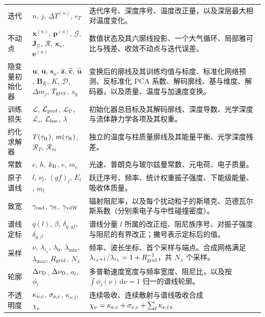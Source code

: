\begin{longtable}{@{}p{}p{}p{}@{}}
迭代 & $n$, $j$, $\Delta T^{(n)}$, $\epsilon_T$ & 迭代序号、深度序号、温度改正量，以及深层最大相对温度变化。 \\
不动点 & $\mathbf{x}^{(n)}$, $\mathbf{p}^{(n)}$, $\mathcal{G}$, $\mathbf{J}_{\mathcal{G}}$, $\mathcal{R}$, $\mathbf{x}_\star$, $\mathbf{e}^{(n)}$ & 数值状态及其六廓线投影、一个大气循环、局部雅可比与残差、收敛不动点与迭代误差。 \\
隐变量初始化器 & $\mathbf{u}$, $\overline{\mathbf u}$, $\mathbf{s}_u$, $\widehat{\mathbf z}$, $\widehat{\mathbf c}$, $\widehat{\mathbf u}$, $\mathbf{B}_K$, $K$, $\mathcal{D}$, $\Delta m_j$, $T_{\rm grey}$, $s_g$ & 变换后的廓线及其训练均值与标度、标准化网络预测、反标准化 PCA 系数、解码廓线、基与维度、解码器，以及质量、温度与加速度变换。 \\
训练损失 & $\mathcal{L}$, $\mathcal{L}_{\rm prof}$, $\mathcal{L}_{\nabla}$, $\mathcal{L}_{\tau}$, $\mathcal{L}_{\rm hse}$, $\lambda$ & 初始化器总目标及其解码廓线、深度导数、光学深度与流体静力学各项及其权重。 \\
约化求解器 & $T(\tau_{\rm R})$, $m(\tau_{\rm R})$, $\mathcal{R}_T$, $\mathcal{R}_m$ & 独立的温度与柱质量廓线及其能量平衡、光学深度残差。 \\
常数 & $c$, $h$, $k_{\rm B}$, $e$, $m_e$ & 光速、普朗克与玻尔兹曼常数、元电荷、电子质量。 \\
原子谱线 & $l$, $\nu_l$, $(gf)_l$, $E_l$, $m_l$ & 跃迁序号、频率、统计权重振子强度、下能级能量、吸收体质量。 \\
致宽 & $\gamma_{\rm rad}$, $\gamma_{\rm S}$, $\gamma_{\rm vdW}$ & 辐射阻尼率，以及每个扰动粒子的斯塔克、范德瓦尔斯系数（分别乘电子与中性碰撞密度）。 \\
谱线定标 & $q(l)$, $\beta$, $\delta_{q,gf}$, $\delta_{q,\beta}$ & 谱线分量 $l$ 所属的改正组、阻尼族序号、对振子强度与阻尼的有界改正；撇号表示定标后的值。 \\
采样 & $\nu$, $\lambda_{i_\lambda}$, $\lambda_0$, $\lambda_{\min}$, $\lambda_{\max}$, $R_{\rm grid}$, $N_\lambda$ & 频率、波长坐标、首个采样与端点。合成网格满足 $\lambda_{i_\lambda+1}/\lambda_{i_\lambda}=1+R_{\rm grid}^{-1}$，共 $N_\lambda$ 个采样。 \\
轮廓 & $\Delta v_{\rm D}$, $\Delta\nu_{\rm D}$, $a_l$, $\phi_l$ & 多普勒速度宽度与频率宽度、阻尼比，以及按 $\int\phi_l(\nu)\,\mathrm{d}\nu=1$ 归一的谱线轮廓。 \\
不透明度 & $\kappa_{\nu,{\rm c}}$, $\sigma_{\nu,{\rm c}}$, $\kappa_{\nu,l}$, $\chi_\nu$ & 连续吸收、连续散射与谱线吸收合成 $\chi_\nu=\kappa_{\nu,{\rm c}}+\sigma_{\nu,{\rm c}}+\sum_l\kappa_{\nu,l}$。 \\

\end{longtable}
